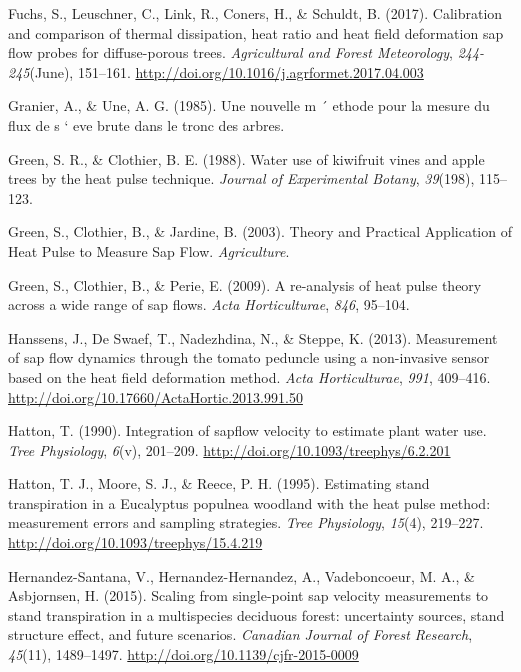 \documentclass[11pt,twoside]{reedthesis}
\begin{document}
\hypertarget{ref-Fuchs2017}{}
Fuchs, S., Leuschner, C., Link, R., Coners, H., \& Schuldt, B. (2017).
Calibration and comparison of thermal dissipation, heat ratio and heat
field deformation sap flow probes for diffuse-porous trees.
\emph{Agricultural and Forest Meteorology}, \emph{244-245}(June),
151--161. \url{http://doi.org/10.1016/j.agrformet.2017.04.003}

\hypertarget{ref-Granier1985}{}
Granier, A., \& Une, A. G. (1985). Une nouvelle m ´ ethode pour la
mesure du flux de s ` eve brute dans le tronc des arbres.

\hypertarget{ref-Green1988}{}
Green, S. R., \& Clothier, B. E. (1988). Water use of kiwifruit vines
and apple trees by the heat pulse technique. \emph{Journal of
Experimental Botany}, \emph{39}(198), 115--123.

\hypertarget{ref-Green2003}{}
Green, S., Clothier, B., \& Jardine, B. (2003). Theory and Practical
Application of Heat Pulse to Measure Sap Flow. \emph{Agriculture}.

\hypertarget{ref-Green2009}{}
Green, S., Clothier, B., \& Perie, E. (2009). A re-analysis of heat
pulse theory across a wide range of sap flows. \emph{Acta
Horticulturae}, \emph{846}, 95--104.

\hypertarget{ref-Hanssens2013}{}
Hanssens, J., De Swaef, T., Nadezhdina, N., \& Steppe, K. (2013).
Measurement of sap flow dynamics through the tomato peduncle using a
non-invasive sensor based on the heat field deformation method.
\emph{Acta Horticulturae}, \emph{991}, 409--416.
\url{http://doi.org/10.17660/ActaHortic.2013.991.50}

\hypertarget{ref-Hatton1990}{}
Hatton, T. (1990). Integration of sapflow velocity to estimate plant
water use. \emph{Tree Physiology}, \emph{6}(v), 201--209.
\url{http://doi.org/10.1093/treephys/6.2.201}

\hypertarget{ref-Hatton1995}{}
Hatton, T. J., Moore, S. J., \& Reece, P. H. (1995). Estimating stand
transpiration in a Eucalyptus populnea woodland with the heat pulse
method: measurement errors and sampling strategies. \emph{Tree
Physiology}, \emph{15}(4), 219--227.
\url{http://doi.org/10.1093/treephys/15.4.219}

\hypertarget{ref-Hernandez-Santana2015}{}
Hernandez-Santana, V., Hernandez-Hernandez, A., Vadeboncoeur, M. A., \&
Asbjornsen, H. (2015). Scaling from single-point sap velocity
measurements to stand transpiration in a multispecies deciduous forest:
uncertainty sources, stand structure effect, and future scenarios.
\emph{Canadian Journal of Forest Research}, \emph{45}(11), 1489--1497.
\url{http://doi.org/10.1139/cjfr-2015-0009}
\end{document}
